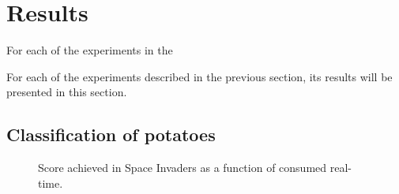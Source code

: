 \documentclass[11pt]{article}
\begin{document}
\section{Results}\label{sec:results}

For each of the experiments in the 


For each of the experiments described in the previous section, its results will be presented in this section.

\subsection{Classification of potatoes}

\begin{figure}[H]
    \centering
    \caption{Score achieved in Space Invaders as a function of
    consumed real-time.}
    \label{fig:results_baseline_potato}
\end{figure}
\end{document}
